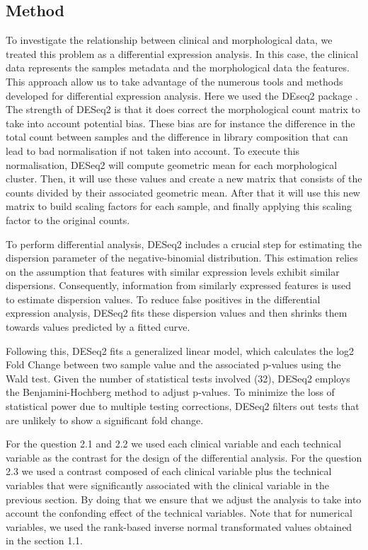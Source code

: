 \documentclass[a4paper, 11pt]{article}
\begin{document}
\begin{multicols}{2}
\subsection*{Method}

To investigate the relationship between clinical and morphological data, we treated this problem as a differential expression analysis. 
In this case, the clinical data represents the samples metadata and the morphological data the features. 
This approach allow us to take advantage of the numerous tools and methods developed for differential expression analysis.
Here we used the DEseq2 package \citep{DESeq2:2014}. The strength of DESeq2 is that it does correct the morphological count matrix to take into account potential bias. 
These bias are for instance the difference in the total count between samples and the difference in library composition that can lead to bad normalisation if not taken into account. 
To execute this normalisation, DESeq2 will compute geometric mean for each morphological cluster. 
Then, it will use these values and create a new matrix that consists of the counts divided by their associated geometric mean. 
After that it will use this new matrix to build scaling factors for each sample, and finally applying this scaling factor to the original counts.

To perform differential analysis, DESeq2 includes a crucial step for estimating the dispersion parameter of the negative-binomial distribution. 
This estimation relies on the assumption that features with similar expression levels exhibit similar dispersions. 
Consequently, information from similarly expressed features is used to estimate dispersion values. 
To reduce false positives in the differential expression analysis, DESeq2 fits these dispersion values and then shrinks them towards values predicted by a fitted curve. 

Following this, DESeq2 fits a generalized linear model, which calculates the log2 Fold Change between two sample value and the associated p-values using the Wald test. 
Given the number of statistical tests involved (32), DESeq2 employs the Benjamini-Hochberg method to adjust p-values. 
To minimize the loss of statistical power due to multiple testing corrections, DESeq2 filters out tests that are unlikely to show a significant fold change.

For the question 2.1 and 2.2 we used each clinical variable and each technical variable as the contrast for the design of the differential analysis.
For the question 2.3 we used a contrast composed of each clinical variable plus the technical variables that were significantly associated with the clinical variable in the previous section.
By doing that we ensure that we adjust the analysis to take into account the confonding effect of the technical variables.
Note that for numerical variables, we used the rank-based inverse normal transformated values obtained in the section 1.1.


\end{multicols}
\end{document}
